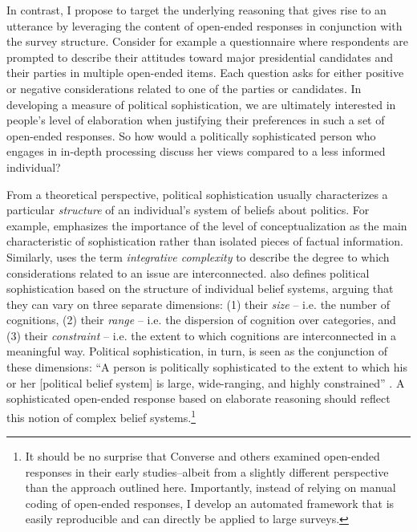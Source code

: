 In contrast, I propose to target the underlying reasoning that gives rise to an utterance by leveraging the content of open-ended responses in conjunction with the survey structure. Consider for example a questionnaire where respondents are prompted to describe their attitudes toward major presidential candidates and their parties in multiple open-ended items. Each question asks for either positive or negative considerations related to one of the parties or candidates. In developing a measure of political sophistication, we are ultimately interested in people's level of elaboration when justifying their preferences in such a set of open-ended responses. So how would a politically sophisticated person who engages in in-depth processing discuss her views compared to a less informed individual?

From a theoretical perspective, political sophistication usually characterizes a particular \textit{structure} of an individual's system of beliefs about politics. For example, \citet{converse1964nature} emphasizes the importance of the level of conceptualization as the main characteristic of sophistication rather than isolated pieces of factual information. Similarly, \citet{tetlock1983cognitive,tetlock1993cognitive} uses the term \textsl{integrative complexity} to describe the degree to which considerations related to an issue are interconnected. \citet{luskin1987measuring} also defines political sophistication based on the structure of individual belief systems, arguing that they can vary on three separate dimensions: (1) their \textsl{size} -- i.e. the number of cognitions, (2) their \textsl{range} -- i.e. the dispersion of cognition over categories, and (3) their \textsl{constraint} -- i.e. the extent to which cognitions are interconnected in a meaningful way. Political sophistication, in turn, is seen as the conjunction of these dimensions: ``A person is politically sophisticated to the extent to which his or her [political belief system] is large, wide-ranging, and highly constrained'' \citep[860]{luskin1987measuring}. A sophisticated open-ended response based on elaborate reasoning should reflect this notion of complex belief systems.\footnote{It should be no surprise that Converse and others examined open-ended responses in their early studies--albeit from a slightly different perspective than the approach outlined here. Importantly, instead of relying on manual coding of open-ended responses, I develop an automated framework that is easily reproducible and can directly be applied to large surveys.}

